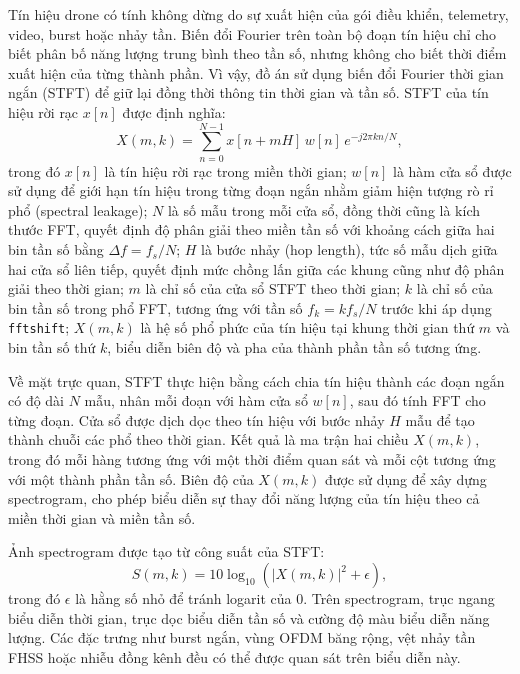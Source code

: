 \documentclass[../DoAn.tex]{subfiles}
\begin{document}
Tín hiệu drone có tính không dừng do sự xuất hiện của gói điều khiển, telemetry, video, burst hoặc nhảy tần. Biến đổi Fourier trên toàn bộ đoạn tín hiệu chỉ cho biết phân bố năng lượng trung bình theo tần số, nhưng không cho biết thời điểm xuất hiện của từng thành phần. Vì vậy, đồ án sử dụng biến đổi Fourier thời gian ngắn (STFT) để giữ lại đồng thời thông tin thời gian và tần số.
STFT của tín hiệu rời rạc $x[n]$ được định nghĩa:
\begin{equation}
    X(m,k)=
    \sum_{n=0}^{N-1}
    x[n+mH]\,w[n]\,
    e^{-j2\pi kn/N},
\end{equation}
trong đó $x[n]$ là tín hiệu rời rạc trong miền thời gian; $w[n]$ là hàm cửa sổ được sử dụng để giới hạn tín hiệu trong từng đoạn ngắn nhằm giảm hiện tượng rò rỉ phổ (spectral leakage); $N$ là số mẫu trong mỗi cửa sổ, đồng thời cũng là kích thước FFT, quyết định độ phân giải theo miền tần số với khoảng cách giữa hai bin tần số bằng $\Delta f=f_s/N$; $H$ là bước nhảy (hop length), tức số mẫu dịch giữa hai cửa sổ liên tiếp, quyết định mức chồng lấn giữa các khung cũng như độ phân giải theo thời gian; $m$ là chỉ số của cửa sổ STFT theo thời gian; $k$ là chỉ số của bin tần số trong phổ FFT, tương ứng với tần số $f_k=kf_s/N$ trước khi áp dụng \texttt{fftshift}; $X(m,k)$ là hệ số phổ phức của tín hiệu tại khung thời gian thứ $m$ và bin tần số thứ $k$, biểu diễn biên độ và pha của thành phần tần số tương ứng.

Về mặt trực quan, STFT thực hiện bằng cách chia tín hiệu thành các đoạn ngắn có độ dài $N$ mẫu, nhân mỗi đoạn với hàm cửa sổ $w[n]$, sau đó tính FFT cho từng đoạn. Cửa sổ được dịch dọc theo tín hiệu với bước nhảy $H$ mẫu để tạo thành chuỗi các phổ theo thời gian. Kết quả là ma trận hai chiều $X(m,k)$, trong đó mỗi hàng tương ứng với một thời điểm quan sát và mỗi cột tương ứng với một thành phần tần số. Biên độ của $X(m,k)$ được sử dụng để xây dựng spectrogram, cho phép biểu diễn sự thay đổi năng lượng của tín hiệu theo cả miền thời gian và miền tần số.

Ảnh spectrogram được tạo từ công suất của STFT:
\begin{equation}
    S(m,k) = 10\log_{10}\left(|X(m,k)|^2 + \epsilon\right),
\end{equation}
trong đó $\epsilon$ là hằng số nhỏ để tránh logarit của 0. Trên spectrogram, trục ngang biểu diễn thời gian, trục dọc biểu diễn tần số và cường độ màu biểu diễn năng lượng. Các đặc trưng như burst ngắn, vùng OFDM băng rộng, vệt nhảy tần FHSS hoặc nhiễu đồng kênh đều có thể được quan sát trên biểu diễn này.
\end{document}
